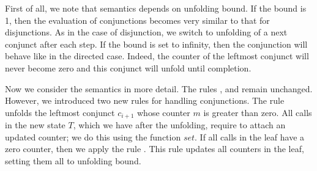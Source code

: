 First of all, we note that semantics depends on unfolding bound. If the bound is 1, then the evaluation of conjunctions becomes very similar to that for disjunctions. As in the case of
disjunction, we switch to unfolding of a next conjunct after each step. If the bound is set to infinity, then the conjunction will behave like in the directed case. Indeed,
the counter of the leftmost conjunct will never become zero and this conjunct will unfold until completion.

Now we consider the semantics in more detail. The rules ,  and  remain unchanged. However, we introduced two new rules for handling conjunctions.
The rule  unfolds the leftmost conjunct $c_{i + 1}$ whose counter $m$ is greater than zero. All calls in the new state $T$, which we have after the unfolding,
require to attach an updated counter; we do this using the function $set$. If all calls in the leaf have a zero counter, then we apply the rule .
This rule updates all counters in the leaf, setting them all to unfolding bound.

